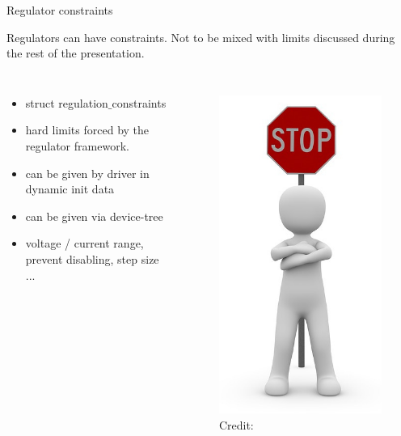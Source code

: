 \documentclass[10pt]{beamer}
\begin{document}

\begin{frame}[t]{Regulator constraints}\vspace{4pt} 
\begin{block}{Regulators can have constraints.}
Not to be mixed with limits discussed during the rest of the presentation.
\end{block}
\par
\begin{columns}
\begin{itemize}
	\item struct regulation$\_$constraints 
	\item hard limits forced by the regulator framework.
	\item can be given by driver in dynamic init data
	\item can be given via device-tree
	\item voltage / current range, prevent disabling, step size ...
\end{itemize}
\begin{figure}
\includegraphics[height=0.55\textheight]{image_dl/stopman.jpg}
\scriptsize Credit:
\end{figure}
\end{columns}
\end{frame}
\end{document}
